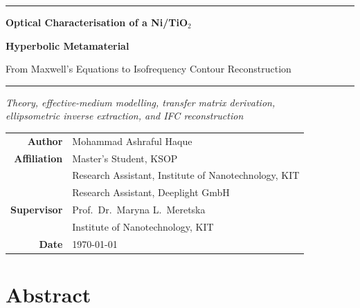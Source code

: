 \documentclass[11pt,a4paper]{report}
\begin{document}
\begin{titlepage}
\centering
\vspace*{2.5cm}
{\color{KITgreen}\rule{\linewidth}{1.2pt}}\par
\vspace{0.6cm}
{\LARGE\bfseries Optical Characterisation of a Ni/TiO$_2$\par}
\vspace{0.3cm}
{\LARGE\bfseries Hyperbolic Metamaterial\par}
\vspace{0.3cm}
{\large From Maxwell's Equations to Isofrequency Contour Reconstruction\par}
\vspace{0.4cm}
{\color{KITgreen}\rule{\linewidth}{1.2pt}}\par
\vspace{1.4cm}
{\large\itshape
  Theory, effective-medium modelling, transfer matrix derivation,\\[4pt]
  ellipsometric inverse extraction, and IFC reconstruction\par}
\vfill
\begin{tabular}{rl}
  \textbf{Author}      & Mohammad Ashraful Haque \\[4pt]
  \textbf{Affiliation} & Master's Student, KSOP \\[2pt]
                       & Research Assistant, Institute of Nanotechnology, KIT \\[2pt]
                       & Research Assistant, Deeplight GmbH \\[6pt]
  \textbf{Supervisor}  & Prof.\ Dr.\ Maryna L.\ Meretska \\[2pt]
                       & Institute of Nanotechnology, KIT \\[6pt]
  \textbf{Date}        & \today
\end{tabular}
\vspace{2.0cm}
\end{titlepage}

\chapter*{Abstract}

\clearpage

\tableofcontents
\clearpage













\end{document}
